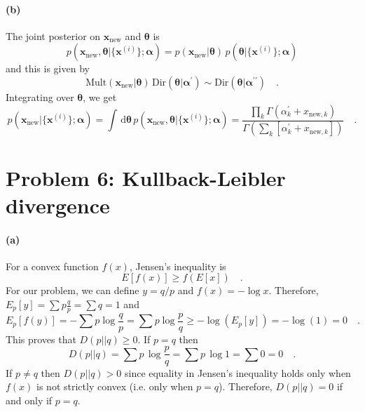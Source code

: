 \documentclass[11pt]{article}
\newcommand{\pr}[1]{\ensuremath{p(#1)}}
\newcommand{\bvec}[1]{\ensuremath{\boldsymbol{#1}}}
\renewcommand{\vector}[1]{\bvec{#1}}
\newcommand{\dd}{\ensuremath{\, \mathrm{d}}}
\begin{document}
\paragraph{(b)} The joint posterior on $\vector{x}_\mathrm{new}$ and
\vector{\theta} is
\begin{equation}
    \pr{\vector{x}_\mathrm{new}, \vector{\theta} | \{\vector{x}^{(i)}\}; \vector{\alpha}}
     = \pr{\vector{x}_\mathrm{new} | \vector{\theta}} \, \pr{\vector{\theta} | \{\vector{x}^{(i)}\}; \vector{\alpha}}
\end{equation}
and this is given by
\begin{equation}
    \mathrm{Mult}(\vector{x}_\mathrm{new} | \vector{\theta}) \, \mathrm{Dir} (\vector{\theta} | \vector{\alpha}^\prime)
    \sim \mathrm{Dir}(\vector{\theta} | \vector{\alpha}^{\prime\prime}) \quad .
\end{equation}
Integrating over \vector{\theta}, we get
\begin{equation}
    \pr{\vector{x}_\mathrm{new} | \{\vector{x}^{(i)}\}; \vector{\alpha}}
    = \int \dd \vector{\theta} \, \pr{\vector{x}_\mathrm{new}, \vector{\theta} | \{\vector{x}^{(i)}\}; \vector{\alpha}}
    = \frac{\prod_k \Gamma \left ( \alpha_k^\prime + x_{\mathrm{new},k} \right )}%
    {\Gamma \left ( \sum_k [\alpha_k^\prime +x_{\mathrm{new},k} ] \right )} \quad .
\end{equation}


\section{Problem 6: Kullback-Leibler divergence}

\paragraph{(a)}

For a convex function $f(x)$, Jensen's inequality is
\begin{equation}
    E[f(x)] \ge f(E[x]) \quad .
\end{equation}
For our problem, we can define $y=q/p$ and $f(x) = -\log x$. Therefore,
$E_p[y] = \sum p \frac{q}{p} = \sum q = 1$ and
\begin{equation}
    E_p[f(y)] = -\sum p \log \frac{q}{p} = \sum p \log \frac{p}{q}
    \ge -\log \left ( E_p[y] \right ) = -\log(1) = 0 \quad .
\end{equation}
This proves that $D(p||q) \ge 0$. If $p=q$ then
\begin{equation}
    D(p||q) = \sum p \, \log \frac{p}{q} = \sum p \, \log 1 = \sum 0 = 0 \quad .
\end{equation}
If $p\ne q$ then $D(p||q) > 0$ since equality in Jensen's inequality holds
only when $f(x)$ is not strictly convex (i.e. only when $p=q$). Therefore,
$D(p||q) = 0$ if and only if $p=q$.
\end{document}
